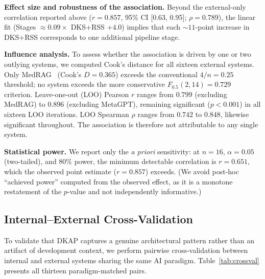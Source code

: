 \documentclass[fleqn,10pt,lineno]{wlpeerj}
\begin{document}
\textbf{Effect size and robustness of the association.} Beyond the external-only correlation reported above ($r = 0.857$, 95\% CI [0.63, 0.95]; $\rho = 0.789$), the linear fit (Stages $\approx 0.09 \times$ DKS+RSS $+ 4.0$) implies that each ${\sim}11$-point increase in DKS+RSS corresponds to one additional pipeline stage.

\textbf{Influence analysis.} To assess whether the association is driven by one or two outlying systems, we computed Cook's distance for all sixteen external systems. Only MedRAG~\citep{medrag} (Cook's $D = 0.365$) exceeds the conventional $4/n = 0.25$ threshold; no system exceeds the more conservative $F_{0.5}(2, 14) = 0.729$ criterion. Leave-one-out (LOO) Pearson $r$ ranges from $0.799$ (excluding MedRAG) to $0.896$ (excluding MetaGPT), remaining significant ($p < 0.001$) in all sixteen LOO iterations. LOO Spearman $\rho$ ranges from $0.742$ to $0.848$, likewise significant throughout. The association is therefore not attributable to any single system.

\textbf{Statistical power.} We report only the \textit{a priori} sensitivity: at $n = 16$, $\alpha = 0.05$ (two-tailed), and $80\%$ power, the minimum detectable correlation is $r = 0.651$, which the observed point estimate ($r = 0.857$) exceeds. (We avoid post-hoc ``achieved power'' computed from the observed effect, as it is a monotone restatement of the $p$-value and not independently informative.)

\subsection{Internal--External Cross-Validation}
\label{sec:crossval}

To validate that DKAP captures a genuine architectural pattern rather than an artifact of development context, we perform pairwise cross-validation between internal and external systems sharing the same AI paradigm. Table~\ref{tab:crossval} presents all thirteen paradigm-matched pairs.
\end{document}
